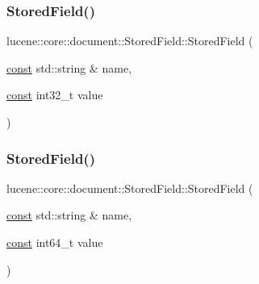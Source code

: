 \mbox{\label{classlucene_1_1core_1_1document_1_1StoredField_a08a6abb7990132374c1f711a39f2e7f8}} 
\subsubsection{\texorpdfstring{Stored\+Field()}{StoredField()}\hspace{0.1cm}{\footnotesize\ttfamily [12/15]}}
{\footnotesize\ttfamily lucene\+::core\+::document\+::\+Stored\+Field\+::\+Stored\+Field (\begin{DoxyParamCaption}\item[{\mbox{\hyperlink{ZlibCrc32_8h_a2c212835823e3c54a8ab6d95c652660e}{const}} std\+::string \&}]{name,  }\item[{\mbox{\hyperlink{ZlibCrc32_8h_a2c212835823e3c54a8ab6d95c652660e}{const}} int32\+\_\+t}]{value }\end{DoxyParamCaption})\hspace{0.3cm}{\ttfamily [inline]}}

\mbox{\label{classlucene_1_1core_1_1document_1_1StoredField_aa847b5a329232f0023f6ef152d4baea1}} 
\subsubsection{\texorpdfstring{Stored\+Field()}{StoredField()}\hspace{0.1cm}{\footnotesize\ttfamily [13/15]}}
{\footnotesize\ttfamily lucene\+::core\+::document\+::\+Stored\+Field\+::\+Stored\+Field (\begin{DoxyParamCaption}\item[{\mbox{\hyperlink{ZlibCrc32_8h_a2c212835823e3c54a8ab6d95c652660e}{const}} std\+::string \&}]{name,  }\item[{\mbox{\hyperlink{ZlibCrc32_8h_a2c212835823e3c54a8ab6d95c652660e}{const}} int64\+\_\+t}]{value }\end{DoxyParamCaption})\hspace{0.3cm}{\ttfamily [inline]}}

